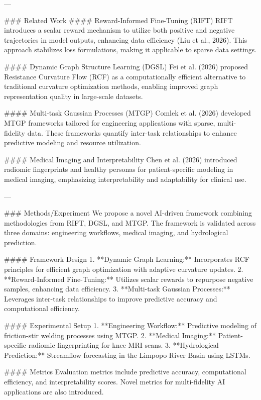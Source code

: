 ---

### Related Work
#### Reward-Informed Fine-Tuning (RIFT)
RIFT introduces a scalar reward mechanism to utilize both positive and negative trajectories in model outputs, enhancing data efficiency (Liu et al., 2026). This approach stabilizes loss formulations, making it applicable to sparse data settings.

#### Dynamic Graph Structure Learning (DGSL)
Fei et al. (2026) proposed Resistance Curvature Flow (RCF) as a computationally efficient alternative to traditional curvature optimization methods, enabling improved graph representation quality in large-scale datasets.

#### Multi-task Gaussian Processes (MTGP)
Comlek et al. (2026) developed MTGP frameworks tailored for engineering applications with sparse, multi-fidelity data. These frameworks quantify inter-task relationships to enhance predictive modeling and resource utilization.

#### Medical Imaging and Interpretability
Chen et al. (2026) introduced radiomic fingerprints and healthy personas for patient-specific modeling in medical imaging, emphasizing interpretability and adaptability for clinical use.

---

### Methods/Experiment
We propose a novel AI-driven framework combining methodologies from RIFT, DGSL, and MTGP. The framework is validated across three domains: engineering workflows, medical imaging, and hydrological prediction.

#### Framework Design
1. **Dynamic Graph Learning:** Incorporates RCF principles for efficient graph optimization with adaptive curvature updates.
2. **Reward-Informed Fine-Tuning:** Utilizes scalar rewards to repurpose negative samples, enhancing data efficiency.
3. **Multi-task Gaussian Processes:** Leverages inter-task relationships to improve predictive accuracy and computational efficiency.

#### Experimental Setup
1. **Engineering Workflow:** Predictive modeling of friction-stir welding processes using MTGP.
2. **Medical Imaging:** Patient-specific radiomic fingerprinting for knee MRI scans.
3. **Hydrological Prediction:** Streamflow forecasting in the Limpopo River Basin using LSTMs.

#### Metrics
Evaluation metrics include predictive accuracy, computational efficiency, and interpretability scores. Novel metrics for multi-fidelity AI applications are also introduced.


